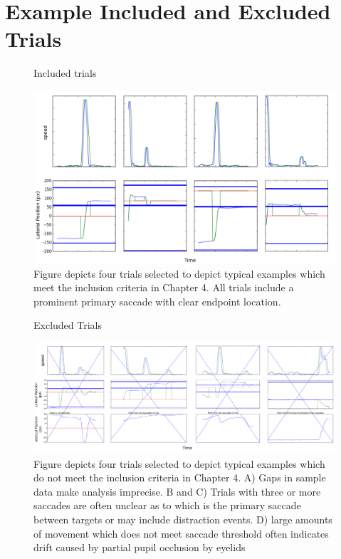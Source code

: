 \appendix
\chapter{Example Included and Excluded Trials}
\label{app}

\begin{figure}[p]
\centering
\begin{sffamily}
\large Included trials

\bigskip

\includegraphics[width=\textwidth]{appendix/accepted}
\end{sffamily}
\caption{Figure depicts four trials selected to depict typical
examples which meet the inclusion criteria in Chapter 4. All trials
include a prominent primary saccade with clear endpoint location.}
\end{figure}

\begin{figure}[p]
\centering
\begin{sffamily}
\large Excluded Trials

\bigskip

\includegraphics[width=\textwidth]{appendix/rejected}
\end{sffamily}
\caption{Figure depicts four trials selected to depict typical
examples which do not meet the inclusion criteria in Chapter 4. A) Gaps
in sample data make analysis imprecise. B and C) Trials with three or more saccades
are often unclear as to which is the primary saccade between targets or may include
distraction events. D) large amounts of movement which does not meet saccade 
threshold often indicates drift caused by partial pupil occlusion by eyelids}
\end{figure}

